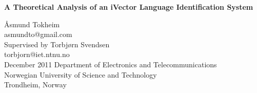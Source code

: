 \begin{titlingpage}
	\centering
	\huge
	\bfseries
	A Theoretical Analysis of an iVector Language Identification System\\[100pt]
	\normalfont
	\large

	Åsmund Tokheim \\
	asmundto@gmail.com \\[15pt]

	Supervised by Torbjørn Svendsen \\
	torbjorn@iet.ntnu.no \\[60pt]

	December 2011
	\vfill
	Department of Electronics and Telecommunications\\
	Norwegian University of Science and Technology\\
	Trondheim, Norway
\end{titlingpage}